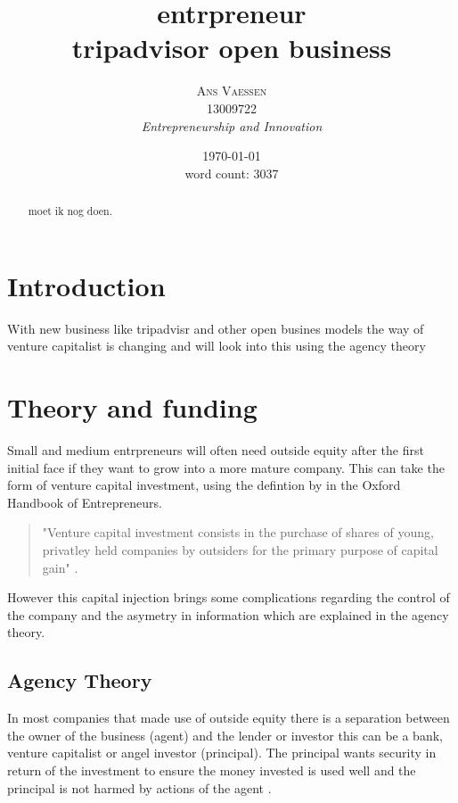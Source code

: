 \documentclass[a4paper, 11pt]{article}
\title{\textbf{entrpreneur}\\tripadvisor open business}
\author{\textsc{Ans Vaessen}
\\13009722
\\{\textit{Entrepreneurship and Innovation}}}
\date{\today\\
word count: 3037}
\begin{document}
\maketitle

\begin{abstract}
moet ik nog doen.
\end{abstract}



\vspace{30pt} %

\section*{Introduction}


With new business like tripadvisr and other open busines models the way of venture capitalist is changing and will  look into this using the agency theory


\section{Theory and funding}


Small and medium entrpreneurs will often need outside equity after the first initial face if they want to grow into a more mature company. This can take the form of venture capital investment, using the defintion by \citep{casson2008oxford} in the Oxford Handbook of Entrepreneurs.

\begin{quote}
"Venture capital investment consists in the purchase of shares of young, privatley held companies by outsiders for the primary purpose of capital gain" \citep[P.1]{casson2008oxford}.
\end{quote} 

However this capital injection brings some complications regarding the control of the company and the asymetry in information which are explained in the agency theory.


\subsection{Agency Theory}



In most companies that made use of outside equity there is a separation between
the owner of the business (agent) and the lender or investor this can be a
bank, venture capitalist or angel investor (principal). The principal wants
security in return of the investment to ensure the money invested is used well
and the principal is not harmed by actions of the agent
\citep{jensen1976theory}.
\end{document}
